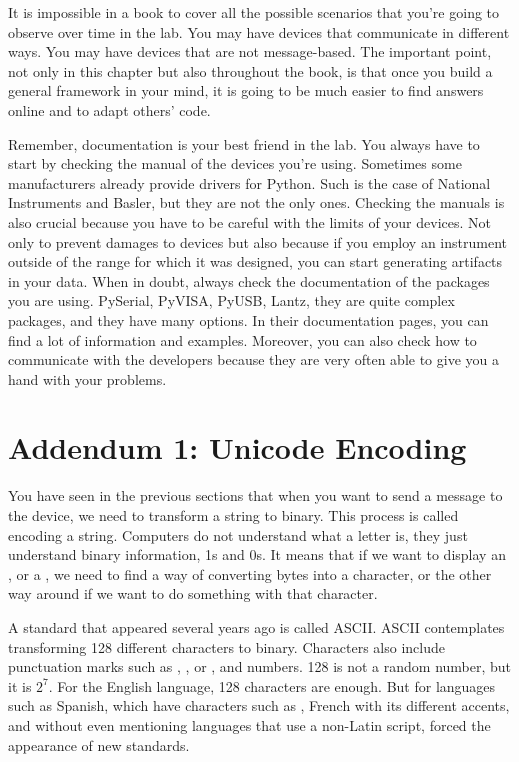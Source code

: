 It is impossible in a book to cover all the possible scenarios that you're going to observe over time in the lab. You may have devices that communicate in different ways. You may have devices that are not message-based. The important point, not only in this chapter but also throughout the book, is that once you build a general framework in your mind, it is going to be much easier to find answers online and to adapt others' code.

Remember, documentation is your best friend in the lab. You always have to start by checking the manual of the devices you're using. Sometimes some manufacturers already provide drivers for Python. Such is the case of National Instruments and Basler, but they are not the only ones. Checking the manuals is also crucial because you have to be careful with the limits of your devices. Not only to prevent damages to devices but also because if you employ an instrument outside of the range for which it was designed, you can start generating artifacts in your data. When in doubt, always check the documentation of the packages you are using. PySerial, PyVISA, PyUSB, Lantz, they are quite complex packages, and they have many options. In their documentation pages, you can find a lot of information and examples. Moreover, you can also check how to communicate with the developers because they are very often able to give you a hand with your problems.

\section{Addendum 1: Unicode Encoding}\label{sec:unicode}
You have seen in the previous sections that when you want to send a message to the device, we need to transform a string to binary. This process is called encoding a string. Computers do not understand what a letter is, they just understand binary information, 1s and 0s. It means that if we want to display an , or a , we need to find a way of converting bytes into a character, or the other way around if we want to do something with that character.

A standard that appeared several years ago is called ASCII. ASCII contemplates transforming 128 different characters to binary. Characters also include punctuation marks such as , \py{!}, or \py{:}, and numbers. 128 is not a random number, but it is $2^7$. For the English language, 128 characters are enough. But for languages such as Spanish, which have characters such as , French with its different accents, and without even mentioning languages that use a non-Latin script, forced the appearance of new standards.


